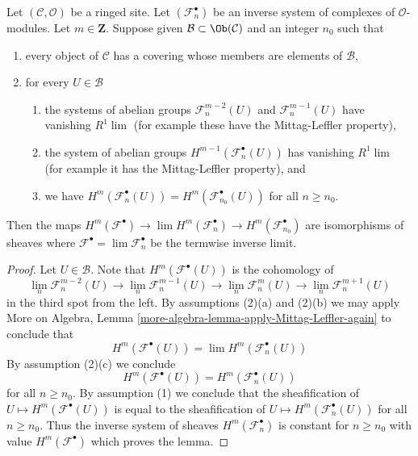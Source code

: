 \begin{lemma}
\label{lemma-inverse-limit-complexes}
Let $(\mathcal{C}, \mathcal{O})$ be a ringed site. Let
$(\mathcal{F}_n^\bullet)$ be an inverse system of complexes of
$\mathcal{O}$-modules. Let $m \in \mathbf{Z}$. Suppose given
$\mathcal{B} \subset \Ob(\mathcal{C})$ and an integer
$n_0$ such that
\begin{enumerate}
\item every object of $\mathcal{C}$ has a covering whose members are
elements of $\mathcal{B}$,
\item for every $U \in \mathcal{B}$
\begin{enumerate}
\item the systems of abelian groups
$\mathcal{F}_n^{m - 2}(U)$ and $\mathcal{F}_n^{m - 1}(U)$
have vanishing $R^1\lim$ (for example these have the Mittag-Leffler property),
\item the system of abelian groups $H^{m - 1}(\mathcal{F}_n^\bullet(U))$
has vanishing $R^1\lim$ (for example it has the Mittag-Leffler property), and
\item we have
$H^m(\mathcal{F}_n^\bullet(U)) = H^m(\mathcal{F}_{n_0}^\bullet(U))$
for all $n \geq n_0$.
\end{enumerate}
\end{enumerate}
Then the maps $H^m(\mathcal{F}^\bullet) \to \lim H^m(\mathcal{F}_n^\bullet)
\to H^m(\mathcal{F}_{n_0}^\bullet)$ are isomorphisms of sheaves where
$\mathcal{F}^\bullet = \lim \mathcal{F}_n^\bullet$ be the termwise
inverse limit. 
\end{lemma}

\begin{proof}
Let $U \in \mathcal{B}$. Note that
$H^m(\mathcal{F}^\bullet(U))$ is the cohomology of
$$
\lim_n \mathcal{F}_n^{m - 2}(U) \to
\lim_n \mathcal{F}_n^{m - 1}(U) \to
\lim_n \mathcal{F}_n^m(U) \to
\lim_n \mathcal{F}_n^{m + 1}(U)
$$
in the third spot from the left. By assumptions (2)(a) and (2)(b)
we may apply
More on Algebra, Lemma \ref{more-algebra-lemma-apply-Mittag-Leffler-again}
to conclude that
$$
H^m(\mathcal{F}^\bullet(U)) = \lim H^m(\mathcal{F}_n^\bullet(U))
$$
By assumption (2)(c) we conclude
$$
H^m(\mathcal{F}^\bullet(U)) = H^m(\mathcal{F}_n^\bullet(U))
$$
for all $n \geq n_0$. By assumption (1) we conclude that the sheafification of
$U \mapsto H^m(\mathcal{F}^\bullet(U))$ is equal to the sheafification
of $U \mapsto H^m(\mathcal{F}_n^\bullet(U))$ for all $n \geq n_0$.
Thus the inverse system of sheaves $H^m(\mathcal{F}_n^\bullet)$ is
constant for $n \geq n_0$ with value $H^m(\mathcal{F}^\bullet)$ which
proves the lemma.
\end{proof}

